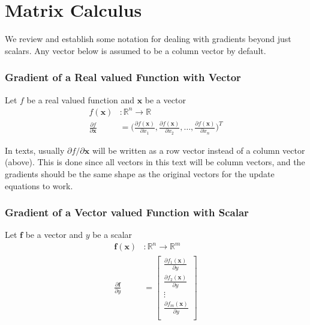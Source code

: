 \documentclass[../../deep_learning_notes.tex]{subfiles}
\begin{document}
\section{Matrix Calculus}
We review and establish some notation for dealing with gradients beyond just scalars. Any vector below is assumed to be a column vector by default.


\subsubsection*{Gradient of a Real valued Function with Vector}
Let $f$ be a real valued function and $\bm{x}$ be a vector
\begin{align*}
    f(\bm{x})&: \mathbb{R}^{n} \rightarrow \mathbb{R}\\
    \frac{\partial f}{\partial \bm{x}} &= \bigg(\frac{\partial f(\bm{x})}{\partial x_{1}}, \frac{\partial f(\bm{x})}{\partial x_{2}},  \ldots, \frac{\partial f(\bm{x})}{\partial x_{n}} \bigg)^{T}
\end{align*}

In texts, usually $\partial f/\partial \bm{x}$ will be written as a row vector instead of a column vector (above). This is done since all vectors in this text will be column vectors, and the gradients should be the same shape as the original vectors for the update equations to work.

\subsubsection*{Gradient of a Vector valued Function with Scalar}
Let $\bm{f}$ be a vector and $y$ be a scalar
\begin{align*}
    \bm{f}(\bm{x})&: \mathbb{R}^{n} \rightarrow \mathbb{R}^{m}\\
    \frac{\partial \bm{f}}{\partial y} &= \begin{bmatrix}
    \frac{\partial f_{1}(\bm{x})}{\partial y}\\
    \frac{\partial f_{2}(\bm{x})}{\partial y}\\
    \vdots\\
    \frac{\partial f_{m}(\bm{x})}{\partial y}\\
    \end{bmatrix}
\end{align*}


\end{document}
